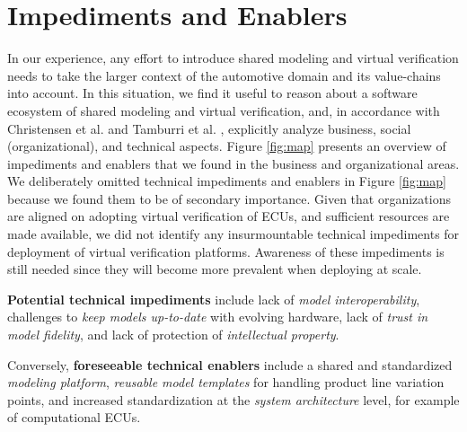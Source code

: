\section{Impediments and Enablers}\label{sec:impediments_and_enablers}
In our experience, any effort to introduce shared modeling and virtual verification needs to take the larger context of the automotive domain and its value-chains into account. 
In this situation, we find it useful to reason about a software ecosystem of shared modeling and virtual verification, and, in accordance with Christensen et al. \cite{christensen2014analysis} and Tamburri et al. \cite{tamburri2013uncovering}, explicitly analyze business, social (organizational), and technical aspects.
Figure \ref{fig:map} presents an overview of impediments and enablers that we found in the business and organizational areas.
We deliberately omitted technical impediments and enablers in Figure \ref{fig:map} because we found them to be of secondary importance.
Given that organizations are aligned on adopting virtual verification of ECUs, and sufficient resources are made available, we did not identify any insurmountable technical impediments for deployment of virtual verification platforms.
Awareness of these impediments is still needed since they will become more prevalent when deploying at scale.

\textbf{Potential technical impediments} include
lack of \emph{model interoperability},
challenges to \emph{keep models up-to-date} with evolving hardware,
lack of \emph{trust in model fidelity},
and lack of protection of \emph{intellectual property}.

Conversely, \textbf{foreseeable technical enablers} include a shared and standardized \emph{modeling platform},
\emph{reusable model templates} for handling product line variation points,
and increased standardization at the \emph{system architecture} level, for example of computational ECUs.



